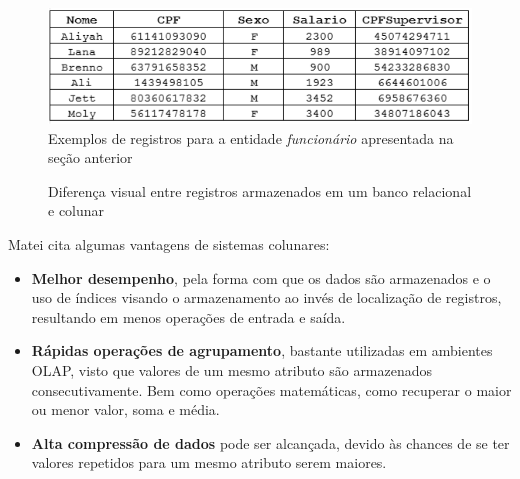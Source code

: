
\begin{figure}[htpb]
	\centering
		\includegraphics[width=12cm]{registros}
	\caption{Exemplos de registros para a entidade \textit{funcionário} apresentada na seção anterior}
	\label{fig:regs}
\end{figure}

\begin{figure}[htpb]
    \centering
    \caption{Diferença visual entre registros armazenados em um banco relacional e colunar}
    \label{fig:row-col}
\end{figure}

Matei \cite{matei2010column} cita algumas vantagens de sistemas colunares:

\begin{itemize}

    \item{\textbf{Melhor desempenho}}, pela forma com que os dados são armazenados e o uso de índices 
    visando o armazenamento ao invés de localização de registros, resultando em menos operações de 
    entrada e saída.
    \item{\textbf{Rápidas operações de agrupamento}}, bastante utilizadas em ambientes OLAP, visto 
    que valores de um mesmo atributo são armazenados consecutivamente. Bem como operações matemáticas, 
    como recuperar o maior ou menor valor, soma e média.
    \item{\textbf{Alta compressão de dados}} pode ser alcançada, devido às chances de se ter 
    valores repetidos para um mesmo atributo serem maiores.

\end{itemize}

